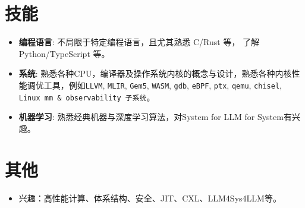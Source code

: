 \documentclass{resume}
\newcommand{\en}[1]{}
\newcommand{\zh}[1]{#1}
\begin{document}
\section{\en{Skills}\zh{技能}}
\begin{itemize}[parsep=0.25ex]
      \item \en{\textbf{Programming Languages}:
                  not limited to any specific language,
                  and experienced in C/Rust,
                  comfortable with Python/TypeScript (in random order).}
            \zh{\textbf{编程语言}:
                  不局限于特定编程语言，且尤其熟悉 C/Rust 等，
                  了解 Python/TypeScript 等。}

      \item \en{\textbf{System}:
                  Specialist in Compiler \& Performance Analysis, familiar with \texttt{LLVM}, \texttt{MLIR}, \texttt{Gem5}, \texttt{WASM}, \texttt{gdb}, \texttt{eBPF}, \texttt{ptx}, \texttt{qemu}, \texttt{chisel}, \texttt{Linux mm \& observability subsystem}.}
            \zh{\textbf{系统}:
                  熟悉各种CPU，编译器及操作系统内核的概念与设计，熟悉各种内核性能调优工具，例如\texttt{LLVM}, \texttt{MLIR}, \texttt{Gem5}, \texttt{WASM}, \texttt{gdb}, \texttt{eBPF}, \texttt{ptx}, \texttt{qemu}, \texttt{chisel}, \texttt{Linux mm \& observability 子系统}。}

      \item \en{\textbf{Machine Learning}:
                  familiar with general knowledge of machine \& deep learning, interested of System for LLM for Sys.}
            \zh{\textbf{机器学习}:
                  熟悉经典机器与深度学习算法，对System for LLM for System有兴趣。}
\end{itemize}

\section{\en{Miscellaneous}\zh{其他}}
\begin{itemize}
      \item \en{Interests: HPC, Architecture, Security, JIT, CXL, LLM4Sys4LLM, etc.}
            \zh{兴趣：高性能计算、体系结构、安全、JIT、CXL、LLM4Sys4LLM等。}
\end{itemize}
\end{document}
